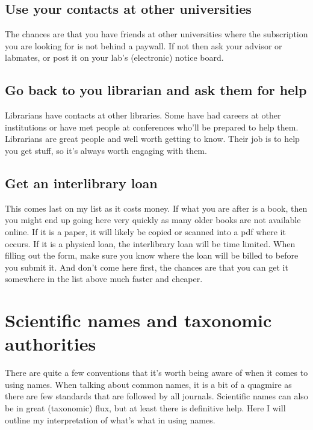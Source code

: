 \documentclass[
]{krantz}
\begin{document}
\hypertarget{use-your-contacts-at-other-universities}{%
\subsection{Use your contacts at other universities}\label{use-your-contacts-at-other-universities}}

The chances are that you have friends at other universities where the subscription you are looking for is not behind a paywall. If not then ask your advisor or labmates, or post it on your lab's (electronic) notice board.

\hypertarget{go-back-to-you-librarian-and-ask-them-for-help}{%
\subsection{Go back to you librarian and ask them for help}\label{go-back-to-you-librarian-and-ask-them-for-help}}

Librarians have contacts at other libraries. Some have had careers at other institutions or have met people at conferences who'll be prepared to help them. Librarians are great people and well worth getting to know. Their job is to help you get stuff, so it's always worth engaging with them.

\hypertarget{get-an-interlibrary-loan}{%
\subsection{Get an interlibrary loan}\label{get-an-interlibrary-loan}}

This comes last on my list as it costs money. If what you are after is a book, then you might end up going here very quickly as many older books are not available online. If it is a paper, it will likely be copied or scanned into a pdf where it occurs. If it is a physical loan, the interlibrary loan will be time limited. When filling out the form, make sure you know where the loan will be billed to before you submit it. And don't come here first, the chances are that you can get it somewhere in the list above much faster and cheaper.

\hypertarget{taxonomy}{%
\section{Scientific names and taxonomic authorities}\label{taxonomy}}

There are quite a few conventions that it's worth being aware of when it comes to using names. When talking about common names, it is a bit of a quagmire as there are few standards that are followed by all journals. Scientific names can also be in great (taxonomic) flux, but at least there is definitive help. Here I will outline my interpretation of what's what in using names.
\end{document}
